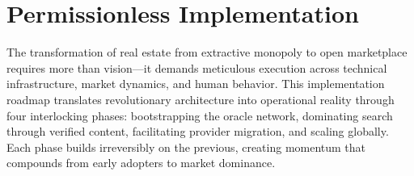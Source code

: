 \chapter{Permissionless Implementation}

The transformation of real estate from extractive monopoly to open marketplace requires more than vision—it demands meticulous execution across technical infrastructure, market dynamics, and human behavior. This implementation roadmap translates revolutionary architecture into operational reality through four interlocking phases: bootstrapping the oracle network, dominating search through verified content, facilitating provider migration, and scaling globally. Each phase builds irreversibly on the previous, creating momentum that compounds from early adopters to market dominance.

